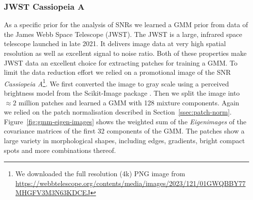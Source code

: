 \documentclass[twocolumn]{aastex631}
\newcommand{\todo}[1]{\textcolor{red}{TODO: #1}\PackageWarning{TODO:}{#1!}}
\begin{document}
    \subsubsection{JWST Cassiopeia A}
    As a specific prior for the analysis of SNRs we learned a GMM prior from data of the James Webb Space Telescope (JWST). The JWST is a large, infrared space telescope launched in late 2021. It delivers image data at very high spatial resolution as well as excellent signal to noise ratio. Both of these properties make JWST data an excellent choice for extracting patches for training a GMM. To limit the data reduction effort we relied on a promotional image of the SNR \textit{Cassiopeia A}\footnote{We downloaded the full resolution (4k)  PNG image from \url{https://webbtelescope.org/contents/media/images/2023/121/01GWQBBY77MHGFV3M3N63KDCEJ}}. We first converted the image to gray scale using a perceived brightness model from the Scikit-Image package \citep{scikit-image}. Then we split the image into $\approx 2$ million patches and learned a GMM with 128 mixture components. Again we relied on the patch normalisation described in Section~\ref{ssec:patch-norm}. Figure~\ref{fig:gmm-eigen-images} shows the weighted sum of the \textit{Eigenimages} of the covariance matrices of the first 32 components of the GMM. The patches show a large variety in morphological shapes, including edges, gradients, bright compact spots and more combinations thereof.

    

\end{document}
